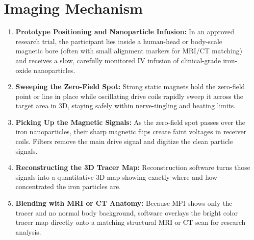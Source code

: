 \section{Imaging Mechanism}
\begin{enumerate}
  \item \textbf{Prototype Positioning and Nanoparticle Infusion:} In an approved research trial, the participant lies inside a human-head or body-scale magnetic bore (often with small alignment markers for MRI/CT matching) and receives a slow, carefully monitored IV infusion of clinical-grade iron-oxide nanoparticles.
  \item \textbf{Sweeping the Zero-Field Spot:} Strong static magnets hold the zero-field point or line in place while oscillating drive coils rapidly sweep it across the target area in 3D, staying safely within nerve-tingling and heating limits.
  \item \textbf{Picking Up the Magnetic Signals:} As the zero-field spot passes over the iron nanoparticles, their sharp magnetic flips create faint voltages in receiver coils. Filters remove the main drive signal and digitize the clean particle signals.
  \item \textbf{Reconstructing the 3D Tracer Map:} Reconstruction software turns those signals into a quantitative 3D map showing exactly where and how concentrated the iron particles are.
  \item \textbf{Blending with MRI or CT Anatomy:} Because MPI shows only the tracer and no normal body background, software overlays the bright color tracer map directly onto a matching structural MRI or CT scan for research analysis.
\end{enumerate}

